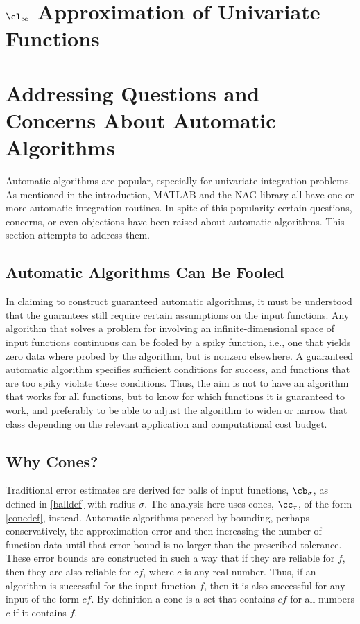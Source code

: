 \documentclass[]{elsarticle}
\theoremstyle{definition}
\theoremstyle{remark}
\begin{document}
\section{$\cl_{\infty}$ Approximation of Univariate Functions} \label{approxsec}



\section{Addressing Questions and Concerns About Automatic Algorithms} \label{overcomesec}

Automatic algorithms are popular, especially for univariate integration problems.  As mentioned in the introduction, MATLAB \cite{TrefEtal12,MAT7.12} and the NAG \cite{NAG23} library all have one or more automatic integration routines.  In spite of this popularity certain questions, concerns, or even objections have been raised about automatic algorithms.  This section attempts to address them.


\subsection{Automatic Algorithms Can Be Fooled}  

In claiming to construct guaranteed automatic algorithms, it must be understood that the guarantees still require certain assumptions on the input functions.  Any algorithm that solves a problem for involving an infinite-dimensional space of input functions continuous can be fooled by a spiky function, i.e., one that yields zero data where probed by the algorithm, but is nonzero elsewhere.  A guaranteed automatic algorithm specifies sufficient conditions for success, and functions that are too spiky violate these conditions.  Thus, the aim is not to have an algorithm that works for all functions, but to know for which functions it is guaranteed to work, and preferably to be able to adjust the algorithm to widen or narrow that class depending on the relevant application and computational cost budget.

\subsection{Why Cones?}

Traditional error estimates are derived for balls of input functions, $\cb_{\sigma}$, as defined in \eqref{balldef} with radius $\sigma$.  The analysis here uses cones, $\cc_{\tau}$, of the form \eqref{conedef}, instead.  Automatic algorithms proceed by bounding, perhaps conservatively, the approximation error and then increasing the number of function data until that error bound is no larger than the prescribed tolerance.  These error bounds are constructed in such a way that if they are reliable for $f$, then they are also reliable for $cf$, where $c$ is any real number.  Thus, if an algorithm is successful for the input function $f$, then it is also successful for any input of the form $cf$.  By definition a cone is a set that contains $cf$ for all numbers $c$ if it contains $f$.
\end{document}
